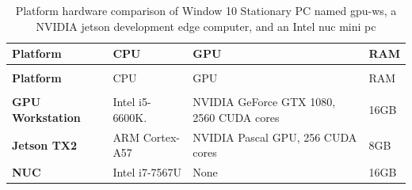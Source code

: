  \begin{minipage}[t]{\linewidth}

\begin{longtabu}{>{\bfseries}X[0.8]|X[0.8]|X[1.5]|X[r0.3]}
	\caption[Platform hardware comparison]{Platform hardware comparison of Window 10 Stationary PC named \gls{gpu-ws}, a NVIDIA \gls{jetson} development edge computer, and an Intel \gls{nuc} mini pc} \label{tbl:platforms} \\
	\toprule
	\rowfont{\bfseries}
	Platform & CPU & GPU & RAM  \tabularnewline
	\bottomrule
	\endfirsthead
	\\
	\toprule
	\rowfont{\bfseries}
	Platform & CPU & GPU & RAM  \tabularnewline
	\bottomrule
	\endhead %
	\bottomrule
	\\
	\endfoot
	\hline
	\endlastfoot
	GPU Workstation	& Intel i5-6600K.	& NVIDIA GeForce GTX 1080, 2560 CUDA cores	& 16GB \tabularnewline
	\hline
	Jetson TX2	& ARM Cortex-A57 	& NVIDIA Pascal GPU, 256 CUDA cores 		& 8GB \tabularnewline
	\hline
	NUC		  	& Intel i7-7567U	& None										& 16GB \tabularnewline									
	\bottomrule
\end{longtabu}
 \end{minipage}

